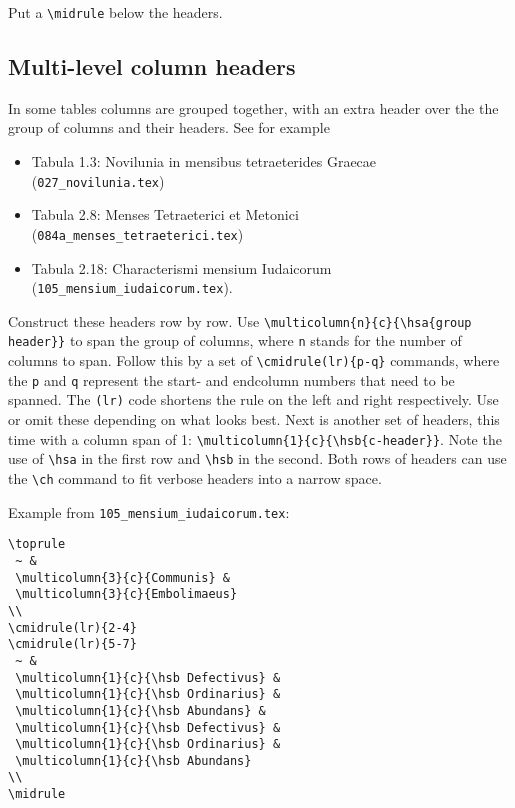 \documentclass{report}
\begin{document}
Put a \verb+\midrule+ below the headers.

\subsection{Multi-level column headers}
In some tables columns are grouped together, with an extra header over
the the group of columns and their headers.
See for example
\begin{itemize}
\item Tabula 1.3: Novilunia in mensibus tetraeterides Graecae
(\verb+027_novilunia.tex+)
\item Tabula 2.8: Menses Tetraeterici et Metonici
(\verb+084a_menses_tetraeterici.tex+)
\item Tabula 2.18: Characterismi mensium Iudaicorum
(\verb+105_mensium_iudaicorum.tex+).
\end{itemize}

Construct these headers row by row.
Use \verb+\multicolumn{n}{c}{\hsa{group header}}+ to span the group of columns,
where \verb+n+ stands for the number of columns to span.
Follow this by a set of \verb+\cmidrule(lr){p-q}+ commands, where the
\verb+p+ and \verb+q+ represent the start- and endcolumn numbers
that need to be spanned. The \verb+(lr)+ code shortens the rule on the
left and right respectively. Use or omit these depending on what looks best.
Next is another set of headers, this time with a column span of 1:
\verb+\multicolumn{1}{c}{\hsb{c-header}}+.
Note the use of \verb+\hsa+ in the first row and \verb+\hsb+ in the second.
Both rows of headers can use the \verb+\ch+ command to fit verbose headers
into a narrow space.

Example from \verb+105_mensium_iudaicorum.tex+:
\begin{verbatim}
\toprule
 ~ &
 \multicolumn{3}{c}{Communis} &
 \multicolumn{3}{c}{Embolimaeus}
\\
\cmidrule(lr){2-4}
\cmidrule(lr){5-7} 
 ~ &
 \multicolumn{1}{c}{\hsb Defectivus} &
 \multicolumn{1}{c}{\hsb Ordinarius} &
 \multicolumn{1}{c}{\hsb Abundans} &
 \multicolumn{1}{c}{\hsb Defectivus} &
 \multicolumn{1}{c}{\hsb Ordinarius} &
 \multicolumn{1}{c}{\hsb Abundans}
\\
\midrule
\end{verbatim}

\end{document}
